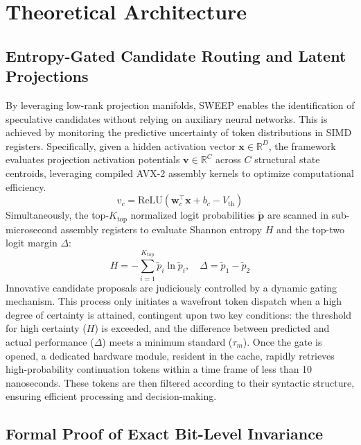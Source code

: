 \documentclass[journal,10pt,twocolumn]{article}
\theoremstyle{definition}
\begin{document}
\section{Theoretical Architecture}

\subsection{Entropy-Gated Candidate Routing and Latent Projections}
By leveraging low-rank projection manifolds, SWEEP enables the identification of speculative candidates without relying on auxiliary neural networks. This is achieved by monitoring the predictive uncertainty of token distributions in SIMD registers. Specifically, given a hidden activation vector $\mathbf{x} \in \mathbb{R}^D$, the framework evaluates projection activation potentials $\mathbf{v} \in \mathbb{R}^C$ across $C$ structural state centroids, leveraging compiled AVX-2 assembly kernels to optimize computational efficiency.
\begin{equation}
v_c = \text{ReLU}\left( \mathbf{w}_c^\top \mathbf{x} + b_c - V_{\text{th}} \right)
\end{equation}
Simultaneously, the top-$K_{\text{top}}$ normalized logit probabilities $\tilde{\mathbf{p}}$ are scanned in sub-microsecond assembly registers to evaluate Shannon entropy $H$ and the top-two logit margin $\Delta$:
\begin{equation}
H = -\sum_{i=1}^{K_{\text{top}}} \tilde{p}_i \ln \tilde{p}_i, \quad \Delta = \tilde{p}_1 - \tilde{p}_2
\end{equation}
Innovative candidate proposals are judiciously controlled by a dynamic gating mechanism. This process only initiates a wavefront token dispatch when a high degree of certainty is attained, contingent upon two key conditions: the threshold for high certainty ($H$) is exceeded, and the difference between predicted and actual performance ($\Delta$) meets a minimum standard ($\tau_m$). Once the gate is opened, a dedicated hardware module, resident in the cache, rapidly retrieves high-probability continuation tokens within a time frame of less than 10 nanoseconds. These tokens are then filtered according to their syntactic structure, ensuring efficient processing and decision-making.

\subsection{Formal Proof of Exact Bit-Level Invariance}
\end{document}

